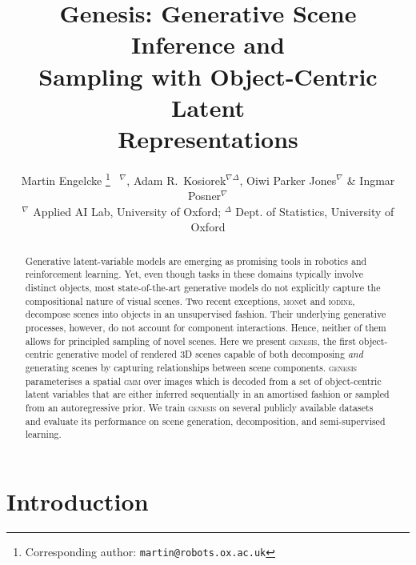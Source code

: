 \documentclass{article}
\title{Genesis: Generative Scene Inference and\\ Sampling with Object-Centric Latent\\ Representations}
\author{
Martin Engelcke
\!\thanks{Corresponding author: \texttt{martin@robots.ox.ac.uk}}
\ $^{\nabla}$, Adam R.~Kosiorek$^{\nabla \Delta}$, Oiwi Parker Jones$^{\nabla}$ \& Ingmar Posner$^{\nabla}$\\
$^{\nabla}$ Applied AI Lab, University of Oxford; 
$^{\Delta}$ Dept. of Statistics, University of Oxford
}
\begin{document}
\maketitle



\begin{abstract}




















Generative latent-variable models are emerging as promising tools in robotics and reinforcement learning. Yet, even though tasks in these domains typically involve distinct objects, most state-of-the-art generative models do not explicitly capture the compositional nature of visual scenes. Two recent exceptions, \textsc{mon}et and \textsc{iodine}, decompose scenes into objects in an unsupervised fashion. Their underlying generative processes, however, do not account for component interactions. Hence, neither of them allows for principled sampling of novel scenes. Here we present \textsc{genesis}, the first  object-centric generative model of rendered 3D scenes capable of both decomposing \emph{and} generating scenes by capturing relationships between scene components. \textsc{genesis} parameterises a spatial \textsc{gmm} over images which is decoded from a set of object-centric latent variables that are either inferred sequentially in an amortised fashion or sampled from an autoregressive prior. We train \textsc{genesis} on several publicly available datasets and evaluate its performance on scene generation, decomposition, and semi-supervised learning. \end{abstract}



\section{Introduction}
\label{sec:introduction}
\end{document}
